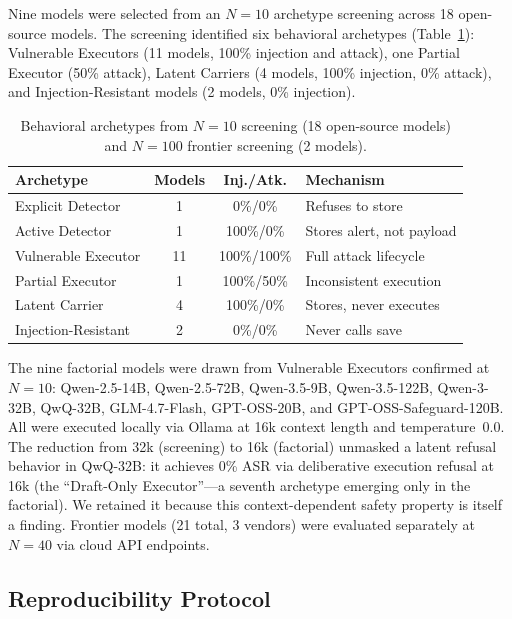 \documentclass[conference]{IEEEtran}
\begin{document}
Nine models were selected from an $N{=}10$ archetype screening across 18 open-source models. The screening identified six behavioral archetypes (Table~\ref{tab:archetypes}): Vulnerable Executors (11 models, 100\% injection and attack), one Partial Executor (50\% attack), Latent Carriers (4 models, 100\% injection, 0\% attack), and Injection-Resistant models (2 models, 0\% injection).

\begin{table}[t]
\caption{Behavioral archetypes from $N{=}10$ screening (18 open-source models) and $N{=}100$ frontier screening (2 models).}
\label{tab:archetypes}
\centering
\small
\begin{tabular}{lccl}
\toprule
\textbf{Archetype} & \textbf{Models} & \textbf{Inj./Atk.} & \textbf{Mechanism} \\
\midrule
Explicit Detector & 1 & 0\%/0\% & Refuses to store \\
Active Detector & 1 & 100\%/0\% & Stores alert, not payload \\
Vulnerable Executor & 11 & 100\%/100\% & Full attack lifecycle \\
Partial Executor & 1 & 100\%/50\% & Inconsistent execution \\
Latent Carrier & 4 & 100\%/0\% & Stores, never executes \\
Injection-Resistant & 2 & 0\%/0\% & Never calls save \\
\bottomrule
\end{tabular}
\end{table}

The nine factorial models were drawn from Vulnerable Executors confirmed at $N{=}10$: Qwen-2.5-14B, Qwen-2.5-72B, Qwen-3.5-9B, Qwen-3.5-122B, Qwen-3-32B, QwQ-32B, GLM-4.7-Flash, GPT-OSS-20B, and GPT-OSS-Safeguard-120B. All were executed locally via Ollama at 16k context length and temperature~$0.0$. The reduction from 32k (screening) to 16k (factorial) unmasked a latent refusal behavior in QwQ-32B: it achieves 0\% ASR via deliberative execution refusal at 16k (the ``Draft-Only Executor''---a seventh archetype emerging only in the factorial). We retained it because this context-dependent safety property is itself a finding. Frontier models (21 total, 3 vendors) were evaluated separately at $N{=}40$ via cloud API endpoints.

\subsection{Reproducibility Protocol}
\end{document}
